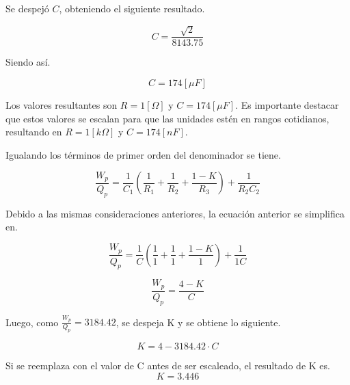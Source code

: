 \documentclass[12pt,A4paper,titlepage]{article}
\begin{document}
\newpage
\hspace{1mm} Se despejó \(C\), obteniendo el siguiente resultado.

\begin{equation}
    C = \frac{\sqrt{2}}{8 143.75}
\end{equation}

\hspace{1mm} Siendo así.

\begin{equation}
    C = 174 [\mu F]
\end{equation}

\bigskip
\hspace{1mm} Los valores resultantes son \(R = 1 [\Omega]\) y \(C = 174 [\mu F]\). Es importante destacar que estos valores se escalan para que las unidades estén en rangos cotidianos, resultando en \(R = 1 [k\Omega]\) y \(C = 174 [nF]\).

\bigskip
\hspace{1mm} Igualando los términos de primer orden del denominador se tiene.

\bigskip
\begin{equation}
    \frac{W_p}{Q_p} = \frac{1}{C_1}(\frac{1}{R_1} + \frac{1}{R_2} + \frac{1-K}{R_3}) + \frac{1}{R_2 C_2}
\end{equation}

\bigskip
\hspace{1mm} Debido a las mismas consideraciones anteriores, la ecuación anterior se simplifica en.

\begin{equation}
    \frac{W_p}{Q_p} = \frac{1}{C}(\frac{1}{1} + \frac{1}{1} + \frac{1-K}{1}) + \frac{1}{1 C}
\end{equation}

\begin{equation}
    \frac{W_p}{Q_p} = \frac{4-K}{C}
\end{equation}

\hspace{1mm} Luego, como \(\frac{W_p}{Q_p} = 3184.42\), se despeja K y se obtiene lo siguiente.

\begin{equation}
    K = 4 - 3 184.42\cdot C 
\end{equation}

\bigskip
\hspace{1mm} Si se reemplaza con el valor de C antes de ser escaleado, el resultado de K es.
\begin{equation}
    K = 3.446
\end{equation}
\end{document}
